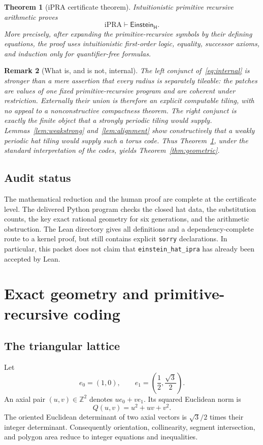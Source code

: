 \documentclass[11pt]{article}
\newtheorem{theorem}{Theorem}[section]
\newtheorem{remark}[theorem]{Remark}
\newcommand{\iPRA}{\mathrm{iPRA}}
\newcommand{\Z}{\mathbb Z}
\newcommand{\Htile}{\mathsf H}
\begin{document}
\begin{theorem}[iPRA certificate theorem]\label{thm:ipra}
Intuitionistic primitive recursive arithmetic proves
\[
   \iPRA\vdash \mathsf{Einstein}_{\Htile}.
\]
More precisely, after expanding the primitive-recursive symbols by their defining
equations, the proof uses intuitionistic first-order logic, equality, successor axioms,
and induction only for quantifier-free formulas.
\end{theorem}

\begin{remark}[What is, and is not, internal]
The left conjunct of~\eqref{eq:internal} is stronger than a mere assertion that every
radius is separately tileable: the patches are values of one fixed primitive-recursive
program and are coherent under restriction.  Externally their union is therefore an
explicit computable tiling, with no appeal to a nonconstructive compactness theorem.
The right conjunct is exactly the finite object that a strongly periodic tiling would
supply.  Lemmas~\ref{lem:weakstrong} and~\ref{lem:alignment} show constructively that a
weakly periodic hat tiling would supply such a torus code.  Thus
Theorem~\ref{thm:ipra}, under the standard interpretation of the codes, yields
Theorem~\ref{thm:geometric}.
\end{remark}

\subsection{Audit status}
The mathematical reduction and the human proof are complete at the certificate level.
The delivered Python program checks the closed hat data, the substitution counts, the
key exact rational geometry for six generations, and the arithmetic obstruction.  The
Lean directory gives all definitions and a dependency-complete route to a kernel proof,
but still contains explicit \texttt{sorry} declarations.  In particular, this packet
does not claim that \texttt{einstein\_hat\_ipra} has already been accepted by Lean.

\section{Exact geometry and primitive-recursive coding}\label{sec:coding}

\subsection{The triangular lattice}
Let
\[
 e_0=(1,0),\qquad e_1=\left(\frac12,\frac{\sqrt3}{2}\right).
\]
An axial pair $(u,v)\in\Z^2$ denotes $u e_0+v e_1$.  Its squared Euclidean norm is
\begin{equation}\label{eq:Q}
 Q(u,v)=u^2+uv+v^2.
\end{equation}
The oriented Euclidean determinant of two axial vectors is $\sqrt3/2$ times their
integer determinant.  Consequently orientation, collinearity, segment intersection,
and polygon area reduce to integer equations and inequalities.
\end{document}
